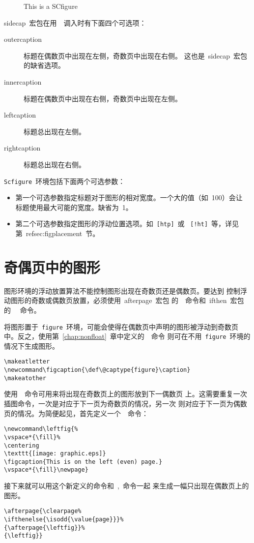 \begin{SCfigure} 
	\resizebox{3in}{!}{\usebox{\graphic}}
	\caption{This is a SCfigure}
	\label{fig:sidecap}
\end{SCfigure}

\noindent\textsf{sidecap}~宏包在用~~调入时有下面四个可选项：
\begin{description}
	\item [outercaption] 标题在偶数页中出现在左侧，奇数页中出现在右侧。
	这也是~\textsf{sidecap}~宏包的缺省选项。
	\item [innercaption] 标题在偶数页中出现在右侧，奇数页中出现在左侧。
	\item [leftcaption]  标题总出现在左侧。
	\item [rightcaption] 标题总出现在右侧。
\end{description}

\noindent\texttt{Scfigure}~环境包括下面两个可选参数：
\begin{itemize}
	\item 第一个可选参数指定标题对于图形的相对宽度。一个大的值（如~100）会让
	标题使用最大可能的宽度。缺省为~1。
	\item 第二个可选参数指定图形的浮动位置选项。如~\texttt{[htp]}~或
	~\texttt{[!ht]}~等，详见第~ref{sec:figplacement}~节。
\end{itemize}

\section{奇偶页中的图形}

图形环境的浮动放置算法不能控制图形出现在奇数页还是偶数页。要达到
控制浮动图形的奇数或偶数页放置，必须使用~\textsf{afterpage}~宏包
的~~命令和~\textsf{ifthen}~宏包的~~
命令。

将图形置于~\texttt{figure}~环境，可能会使得在偶数页中声明的图形被浮动到奇数页
中。反之，使用第~\ref{chap:nonfloat}~章中定义的~~命令
则可在不用~\texttt{figure}~环境的情况下生成图形。
\begin{Verbatim}[xleftmargin=1cm]
\makeatletter 
\newcommand\figcaption{\def\@captype{figure}\caption} 
\makeatother
\end{Verbatim}

使用~~命令可用来将出现在奇数页上的图形放到下一偶数页
上。这需要重复一次插图命令，一次是对应于下一页为奇数页的情况，另一次
则对应于下一页为偶数页的情况。为简便起见，首先定义一个~~命令：
\begin{Verbatim}[xleftmargin=1cm]
\newcommand\leftfig{% 
\vspace*{\fill}% 
\centering 
\texttt{[image: graphic.eps]} 
\figcaption{This is on the left (even) page.} 
\vspace*{\fill}\newpage}
\end{Verbatim}
接下来就可以用这个新定义的命令和~,~命令一起
来生成一幅只出现在偶数页上的图形。
\begin{Verbatim}[xleftmargin=1cm]
\afterpage{\clearpage% 
\ifthenelse{\isodd{\value{page}}}% 
{\afterpage{\leftfig}}% 
{\leftfig}}
\end{Verbatim}

